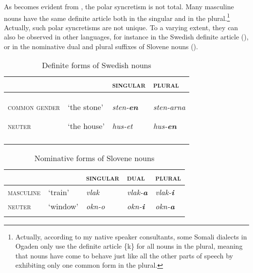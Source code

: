 \documentclass[output=paper]{langsci/langscibook}
\begin{document}
As becomes evident from , the polar syncretism is not total. Many masculine nouns have the same definite article both in the singular and in the plural.\footnote{Actually, according to my native speaker consultants, some Somali dialects in Ogaden only use the definite article \{k\} for all nouns in the plural, meaning that nouns have come to behave just like all the other parts of speech by exhibiting only one common form in the plural.} Actually, such polar syncretisms are not unique. To a varying extent, they can also be observed in other languages, for instance in the Swedish definite article (), or in the nominative dual and plural suffixes of Slovene nouns ().
 
\begin{table}
\caption{Definite forms of Swedish nouns}
\label{tab:nilsson:7}

\begin{tabularx}{\textwidth}{XXXX}
\lsptoprule
& & {\textsc{singular}} & {\textsc{plural}} \\
\midrule
{\textsc{common gender}}

{\textsc{neuter}} & {‘the stone’}

{‘the house’} & {\textit{sten-}\textbf{\textit{en}}}

{\textit{hus-et}} &  {\textit{sten-arna}}

{\textit{hus-}\textbf{\textit{en}}} \\
\lspbottomrule
\end{tabularx}

\end{table} 

 
\begin{table}
\caption{Nominative forms of Slovene nouns}
\label{tab:nilsson:8}
\begin{tabularx}{\textwidth}{XXXXX}
\lsptoprule
& & {\textsc{singular}} &  {\textsc{dual}} & {\textsc{plural}} \\
\midrule
{\textsc{masculine}} & {‘train’} & {\textit{vlak}} & {\textit{vlak-}\textbf{\textit{a}}} & {\textit{vlak-}\textbf{\textit{i}}} \\

{\textsc{neuter}} & {‘window’} & {\textit{okn-o}} & {\textit{okn-}\textbf{\textit{i}}} & {\textit{okn-}\textbf{\textit{a}}} \\
\lspbottomrule
\end{tabularx}

\end{table} 
\end{document}
